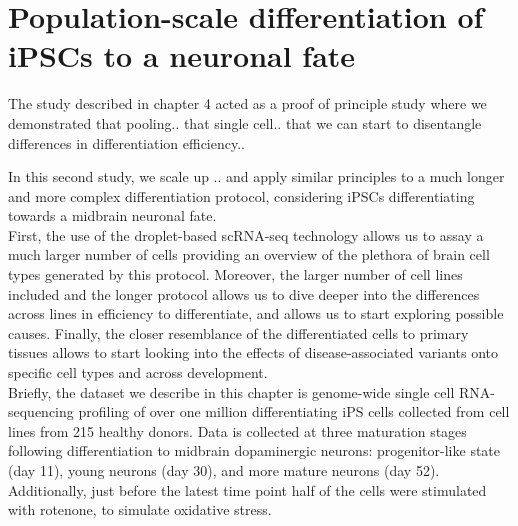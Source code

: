 
\chapter{Population-scale differentiation of iPSCs to a neuronal fate}

The study described in chapter 4 acted as a proof of principle study where we demonstrated that pooling..
that single cell..
that we can start to disentangle differences in differentiation efficiency..

In this second study, we scale up .. and apply similar principles to a much longer and more complex differentiation protocol, considering iPSCs differentiating towards a midbrain neuronal fate.\\

First, the use of the droplet-based scRNA-seq technology allows us to assay a much larger number of cells providing an overview of the plethora of brain cell types generated by this protocol. 
Moreover, the larger number of cell lines included and the longer protocol allows us to dive deeper into the differences across lines in efficiency to differentiate, and allows us to start exploring possible causes.
Finally, the closer resemblance of the differentiated cells to primary tissues allows to start looking into the effects of disease-associated variants onto specific cell types and across development. \\

Briefly, the dataset we describe in this chapter is genome-wide single cell RNA-sequencing profiling of over one million differentiating iPS cells collected from cell lines from 215 healthy donors. 
Data is collected at three maturation stages following differentiation to midbrain dopaminergic neurons: progenitor-like state (day 11), young neurons (day 30), and more mature neurons (day 52). 
Additionally, just before the latest time point half of the cells were stimulated with rotenone, to simulate oxidative stress. 

\newpage

